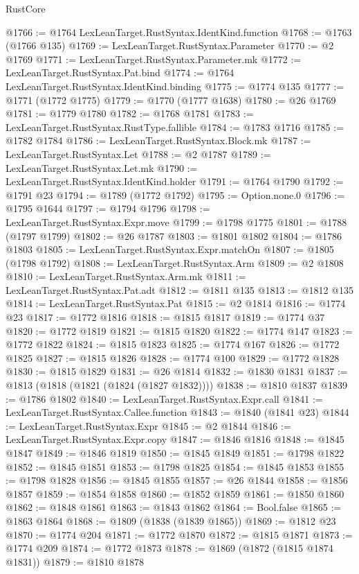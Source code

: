\begin{lexlean}{RustCore}
\begin{coremodule}
@1766 := @1764 LexLeanTarget.RustSyntax.IdentKind.function
@1768 := @1763 (@1766 @135)
@1769 := LexLeanTarget.RustSyntax.Parameter
@1770 := @2 @1769
@1771 := LexLeanTarget.RustSyntax.Parameter.mk
@1772 := LexLeanTarget.RustSyntax.Pat.bind
@1774 := @1764 LexLeanTarget.RustSyntax.IdentKind.binding
@1775 := @1774 @135
@1777 := @1771 (@1772 @1775)
@1779 := @1770 (@1777 @1638)
@1780 := @26 @1769
@1781 := @1779 @1780
@1782 := @1768 @1781
@1783 := LexLeanTarget.RustSyntax.RustType.fallible
@1784 := @1783 @1716
@1785 := @1782 @1784
@1786 := LexLeanTarget.RustSyntax.Block.mk
@1787 := LexLeanTarget.RustSyntax.Let
@1788 := @2 @1787
@1789 := LexLeanTarget.RustSyntax.Let.mk
@1790 := LexLeanTarget.RustSyntax.IdentKind.holder
@1791 := @1764 @1790
@1792 := @1791 @23
@1794 := @1789 (@1772 @1792)
@1795 := Option.none.{0}
@1796 := @1795 @1644
@1797 := @1794 @1796
@1798 := LexLeanTarget.RustSyntax.Expr.move
@1799 := @1798 @1775
@1801 := @1788 (@1797 @1799)
@1802 := @26 @1787
@1803 := @1801 @1802
@1804 := @1786 @1803
@1805 := LexLeanTarget.RustSyntax.Expr.matchOn
@1807 := @1805 (@1798 @1792)
@1808 := LexLeanTarget.RustSyntax.Arm
@1809 := @2 @1808
@1810 := LexLeanTarget.RustSyntax.Arm.mk
@1811 := LexLeanTarget.RustSyntax.Pat.adt
@1812 := @1811 @135
@1813 := @1812 @135
@1814 := LexLeanTarget.RustSyntax.Pat
@1815 := @2 @1814
@1816 := @1774 @23
@1817 := @1772 @1816
@1818 := @1815 @1817
@1819 := @1774 @37
@1820 := @1772 @1819
@1821 := @1815 @1820
@1822 := @1774 @147
@1823 := @1772 @1822
@1824 := @1815 @1823
@1825 := @1774 @167
@1826 := @1772 @1825
@1827 := @1815 @1826
@1828 := @1774 @100
@1829 := @1772 @1828
@1830 := @1815 @1829
@1831 := @26 @1814
@1832 := @1830 @1831
@1837 := @1813 (@1818 (@1821 (@1824 (@1827 @1832))))
@1838 := @1810 @1837
@1839 := @1786 @1802
@1840 := LexLeanTarget.RustSyntax.Expr.call
@1841 := LexLeanTarget.RustSyntax.Callee.function
@1843 := @1840 (@1841 @23)
@1844 := LexLeanTarget.RustSyntax.Expr
@1845 := @2 @1844
@1846 := LexLeanTarget.RustSyntax.Expr.copy
@1847 := @1846 @1816
@1848 := @1845 @1847
@1849 := @1846 @1819
@1850 := @1845 @1849
@1851 := @1798 @1822
@1852 := @1845 @1851
@1853 := @1798 @1825
@1854 := @1845 @1853
@1855 := @1798 @1828
@1856 := @1845 @1855
@1857 := @26 @1844
@1858 := @1856 @1857
@1859 := @1854 @1858
@1860 := @1852 @1859
@1861 := @1850 @1860
@1862 := @1848 @1861
@1863 := @1843 @1862
@1864 := Bool.false
@1865 := @1863 @1864
@1868 := @1809 (@1838 (@1839 @1865))
@1869 := @1812 @23
@1870 := @1774 @204
@1871 := @1772 @1870
@1872 := @1815 @1871
@1873 := @1774 @209
@1874 := @1772 @1873
@1878 := @1869 (@1872 (@1815 @1874 @1831))
@1879 := @1810 @1878

\end{coremodule}
\end{lexlean}
